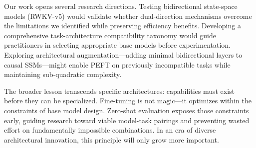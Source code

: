 Our work opens several research directions. Testing bidirectional state-space models (RWKV-v5) would validate whether dual-direction mechanisms overcome the limitations we identified while preserving efficiency benefits. Developing a comprehensive task-architecture compatibility taxonomy would guide practitioners in selecting appropriate base models before experimentation. Exploring architectural augmentation---adding minimal bidirectional layers to causal SSMs---might enable PEFT on previously incompatible tasks while maintaining sub-quadratic complexity.

The broader lesson transcends specific architectures: capabilities must exist before they can be specialized. Fine-tuning is not magic---it optimizes within the constraints of base model design. Zero-shot evaluation exposes those constraints early, guiding research toward viable model-task pairings and preventing wasted effort on fundamentally impossible combinations. In an era of diverse architectural innovation, this principle will only grow more important.
